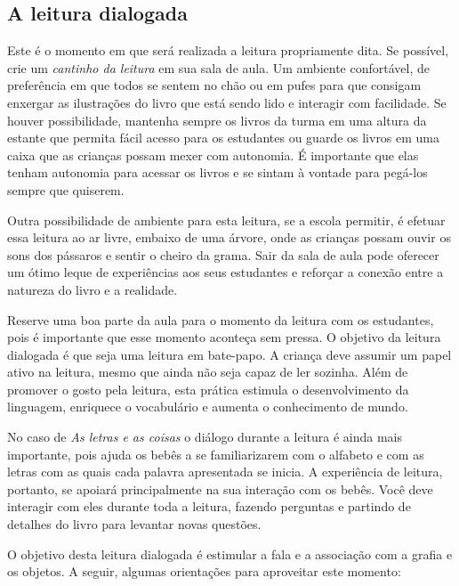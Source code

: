 \documentclass[11pt]{extarticle}
\begin{document}
\subsection{A leitura dialogada}
Este é o momento em que será realizada a leitura propriamente dita. 
Se possível, crie um \textit{cantinho da leitura} em sua sala de aula. Um 
ambiente confortável, de preferência em que todos se sentem no chão ou 
em pufes para que consigam enxergar as ilustrações do livro que está 
sendo lido e interagir com facilidade. Se houver possibilidade, mantenha 
sempre os livros da turma em uma altura da estante que permita fácil 
acesso para os estudantes ou guarde os livros em uma caixa que as crianças 
possam mexer com autonomia. É importante que elas tenham autonomia para 
acessar os livros e se sintam à vontade para pegá-los sempre que quiserem. 

Outra possibilidade de ambiente para esta leitura, se a escola permitir, 
é efetuar essa leitura ao ar livre, embaixo de uma árvore, onde as crianças 
possam ouvir os sons dos pássaros e sentir o cheiro da grama. Sair da sala 
de aula pode oferecer um ótimo leque de experiências aos seus estudantes e 
reforçar a conexão entre a natureza do livro e a realidade.  

Reserve uma boa parte da aula para o momento da leitura com os estudantes, 
pois é importante que esse momento aconteça sem pressa. O objetivo da 
leitura dialogada é que seja uma leitura em bate-papo. A criança deve 
assumir um papel ativo na leitura, mesmo que ainda não seja capaz de 
ler sozinha. Além de promover o gosto pela leitura, esta prática estimula 
o desenvolvimento da linguagem, enriquece o vocabulário e 
aumenta o conhecimento de mundo.

No caso de \textit{As letras e as coisas} o diálogo durante a leitura é 
ainda mais importante, pois ajuda os bebês a se familiarizarem com o alfabeto e com as letras com as quais cada palavra apresentada se inicia.
A experiência de leitura, portanto, se apoiará principalmente na sua interação com os bebês. 
Você deve interagir com eles durante toda a 
leitura, fazendo perguntas e partindo de detalhes do livro para 
levantar novas questões. 

O objetivo desta leitura dialogada é estimular a fala e a associação com a grafia e os objetos.
A seguir, algumas orientações para aproveitar este momento: 
\end{document}
